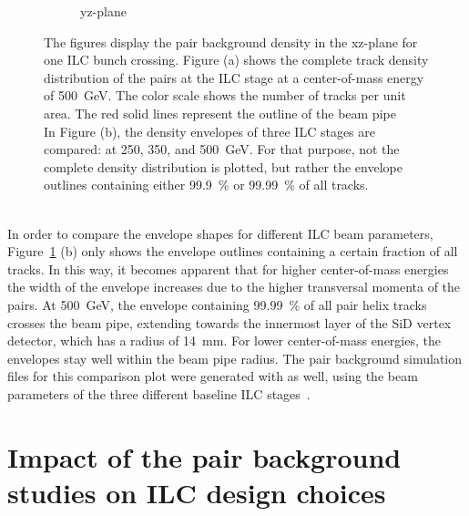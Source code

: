\begin{figure}
\begin{subfigure}[b]{0.49\textwidth}
   \caption{yz-plane}
   \end{subfigure}
   \caption[Pair background density]{The figures display the pair background density in the xz-plane for one ILC bunch crossing.
   Figure (a) shows the complete track density distribution of the pairs at the ILC stage at a center-of-mass energy of \SI[detect-all]{500}{\GeV}.
   The color scale shows the number of tracks per unit area.
   The red solid lines represent the outline of the beam pipe
   \\In Figure (b), the density envelopes of three ILC stages are compared: at 250, 350, and \SI[detect-all]{500}{\GeV}.
   For that purpose, not the complete density distribution is plotted, but rather the envelope outlines containing either \SI[detect-all]{99.9}{\percent} or \SI[detect-all]{99.99}{\percent} of all tracks.
   }
   \label{fig:PairBkg:Density}
 \end{figure}
\\In order to compare the envelope shapes for different ILC beam parameters, Figure~\ref{fig:PairBkg:Density} (b) only shows the envelope outlines containing a certain fraction of all tracks.
In this way, it becomes apparent that for higher center-of-mass energies the width of the envelope increases due to the higher transversal momenta of the pairs.
At \SI{500}{\GeV}, the envelope containing \SI{99.99}{\percent} of all pair helix tracks crosses the beam pipe, extending towards the innermost layer of the SiD vertex detector, which has a radius of \SI{14}{\milli\meter}.
For lower center-of-mass energies, the envelopes stay well within the beam pipe radius.
The pair background simulation files for this comparison plot were generated with \guineapig as well, using the beam parameters of the three different baseline ILC stages~\cite[p. 11]{TDR1}.

\section{Impact of the pair background studies on ILC design choices}
